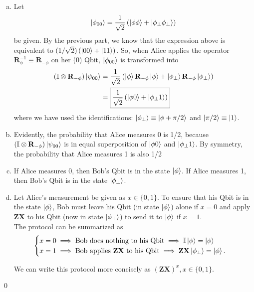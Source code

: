 \documentclass{book}
\theoremstyle{definition}
\newcommand{\nn}{\nonumber}
\newcommand{\X}{\mathbf{X}}
\newcommand{\f}[2]{\frac{#1}{#2}}
\newcommand{\lp}{\left(}
\newcommand{\rp}{\right)}
\newcommand{\Id}{\mathbb{I}}
\newcommand{\Z}{\mathbf{Z}}
\begin{document}
\begin{enumerate}[(a)]
	\item Let 
	\begin{align}
	\ket{\phi_{00}} = \f{1}{\sqrt{2}}\lp \ket{\phi\phi}  + \ket{\phi_\perp\phi_\perp}\rp
	\end{align}
	be given. By the previous part, we know that the expression above is equivalent to $(1/\sqrt{2})\lp \ket{00} + \ket{11} \rp$. So, when Alice applies the operator $\mathbf{R}_{\phi}^{-1} \equiv \mathbf{R}_{-\phi}$ on her (0) Qbit, $\ket{\phi_{00}}$ is transformed into
	\begin{align}
	(\Id \otimes \mathbf{R}_{-\phi})\ket{\psi_{00}} &= \f{1}{\sqrt{2}}\lp \ket{\phi}\mathbf{R}_{-\phi}\ket{\phi} + \ket{\phi_\perp}\mathbf{R}_{-\phi}\ket{\phi_\perp} \rp\nn\\
	&= \boxed{\f{1}{\sqrt{2}}\lp \ket{\phi 0} + \ket{\phi_\perp 1} \rp}
	\end{align}
	where we have used the identifications: $\ket{\phi_\perp} \equiv\ket{\phi + \pi/2}$ and $\ket{\pi/2} \equiv \ket{1}$. 
	
	
	\item Evidently, the probability that Alice measures 0 is 1/2, because $(\Id \otimes \mathbf{R}_{-\phi})\ket{\psi_{00}}$ is in equal superposition of $\ket{\phi 0}$ and $\ket{\phi_\perp 1}$. By symmetry, the probability that Alice measures 1 is also 1/2 
	
	\item  If Alice measures 0, then Bob's Qbit is in the state $\ket{\phi}$. If Alice measures 1, then Bob's Qbit is in the state $\ket{\phi_\perp}$.
	
	
	\item Let Alice's measurement be given as $x \in \{0,1\}$. To ensure that his Qbit is in the state $\ket{\phi}$, Bob must leave his Qbit (in state $\ket{\phi}$) alone if $x=0$ and apply $\Z\X$ to his Qbit (now in state $\ket{\phi_\perp}$) to send it to $\ket{\phi}$ if $x = 1$. \\
	
	The protocol can be summarized as
	\begin{align}
	\begin{cases}
	x = 0 \implies \text{Bob does nothing to his Qbit} \implies \Id\ket{\phi} = \ket{\phi}\\
	x = 1 \implies \text{Bob applies $\Z\X$ to his Qbit} \implies \Z \X \ket{\phi_\perp} = \ket{\phi}.
	\end{cases}
	\end{align}
	
	We can write this protocol more concisely as $\boxed{\lp \Z \X \rp^x, x \in \{0,1\}}$. 
	

	
	
	
\end{enumerate}\qed
\end{document}
